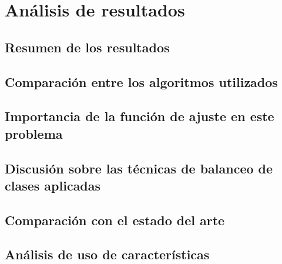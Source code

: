 \section{Análisis de resultados}

\subsection{Resumen de los resultados}

\subsection{Comparación entre los algoritmos utilizados}

\subsection{Importancia de la función de ajuste en este problema}

\subsection{Discusión sobre las técnicas de balanceo de clases aplicadas}

\subsection{Comparación con el estado del arte}

\subsection{Análisis de uso de características}


\newpage
